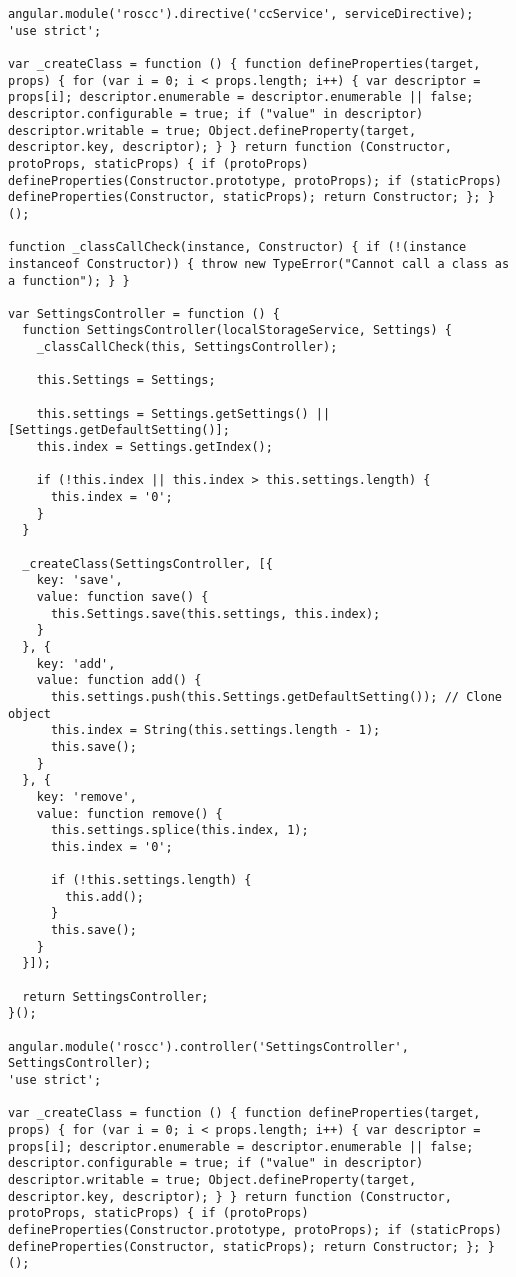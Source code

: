 \begin{verbatim}
angular.module('roscc').directive('ccService', serviceDirective);
'use strict';

var _createClass = function () { function defineProperties(target, props) { for (var i = 0; i < props.length; i++) { var descriptor = props[i]; descriptor.enumerable = descriptor.enumerable || false; descriptor.configurable = true; if ("value" in descriptor) descriptor.writable = true; Object.defineProperty(target, descriptor.key, descriptor); } } return function (Constructor, protoProps, staticProps) { if (protoProps) defineProperties(Constructor.prototype, protoProps); if (staticProps) defineProperties(Constructor, staticProps); return Constructor; }; }();

function _classCallCheck(instance, Constructor) { if (!(instance instanceof Constructor)) { throw new TypeError("Cannot call a class as a function"); } }

var SettingsController = function () {
  function SettingsController(localStorageService, Settings) {
    _classCallCheck(this, SettingsController);

    this.Settings = Settings;

    this.settings = Settings.getSettings() || [Settings.getDefaultSetting()];
    this.index = Settings.getIndex();

    if (!this.index || this.index > this.settings.length) {
      this.index = '0';
    }
  }

  _createClass(SettingsController, [{
    key: 'save',
    value: function save() {
      this.Settings.save(this.settings, this.index);
    }
  }, {
    key: 'add',
    value: function add() {
      this.settings.push(this.Settings.getDefaultSetting()); // Clone object
      this.index = String(this.settings.length - 1);
      this.save();
    }
  }, {
    key: 'remove',
    value: function remove() {
      this.settings.splice(this.index, 1);
      this.index = '0';

      if (!this.settings.length) {
        this.add();
      }
      this.save();
    }
  }]);

  return SettingsController;
}();

angular.module('roscc').controller('SettingsController', SettingsController);
'use strict';

var _createClass = function () { function defineProperties(target, props) { for (var i = 0; i < props.length; i++) { var descriptor = props[i]; descriptor.enumerable = descriptor.enumerable || false; descriptor.configurable = true; if ("value" in descriptor) descriptor.writable = true; Object.defineProperty(target, descriptor.key, descriptor); } } return function (Constructor, protoProps, staticProps) { if (protoProps) defineProperties(Constructor.prototype, protoProps); if (staticProps) defineProperties(Constructor, staticProps); return Constructor; }; }();


\end{verbatim}
